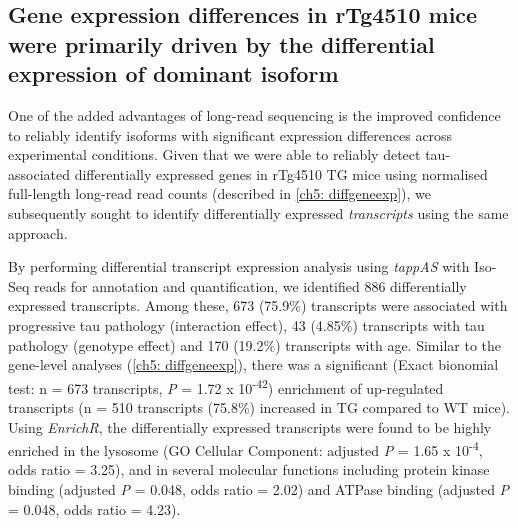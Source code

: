 \clearpage
\subsection{Gene expression differences in rTg4510 mice were primarily driven by the differential expression of dominant isoform}
One of the added advantages of long-read sequencing is the improved confidence to reliably identify isoforms with significant expression differences across experimental conditions. Given that we were able to reliably detect tau-associated differentially expressed genes in rTg4510 TG mice using normalised full-length long-read read counts (described in \cref{ch5: diffgeneexp}), we subsequently sought to identify differentially expressed \textit{transcripts} using the same approach. 

By performing differential transcript expression analysis using \textit{tappAS} with Iso-Seq reads for annotation and quantification, we identified 886 differentially expressed transcripts. Among these, 673 (75.9\%) transcripts were associated with progressive tau pathology (interaction effect), 43 (4.85\%) transcripts with tau pathology (genotype effect) and 170 (19.2\%) transcripts with age. Similar to the gene-level analyses (\cref{ch5: diffgeneexp}), there was a significant (Exact bionomial test: n = 673 transcripts, \textit{P} = 1.72 x 10\textsuperscript{-42}) enrichment of up-regulated transcripts (n = 510 transcripts (75.8\%) increased in TG compared to WT mice). Using \textit{EnrichR}, the differentially expressed transcripts were found to be highly enriched in the lysosome (GO Cellular Component: adjusted \textit{P} = 1.65 x 10\textsuperscript{-4}, odds ratio = 3.25), and in several molecular functions including protein kinase binding (adjusted \textit{P} = 0.048, odds ratio = 2.02) and ATPase binding (adjusted \textit{P} = 0.048, odds ratio = 4.23).  

